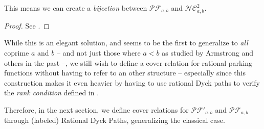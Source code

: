 \begin{prop}
    This means we can create a \emph{bijection} between
    $\mathcal{PF}_{a,b}$ and $\mathcal{NC}^2_{a,b}$.
\end{prop}

\begin{proof}
    See \cite{ref8}.
\end{proof}

While this is an elegant solution, and seems to be the first
to generalize to \emph{all} coprime $a$ and $b$ -- and 
not just those where $a < b$ as studied by Armstrong and others
in the past --, we still wish to define a cover relation for
rational parking functions without having to refer to an other
structure -- especially since this construction makes it even
heavier by having to use rational Dyck paths to verify the
\emph{rank condition} defined in \cite{ref8}.

Therefore, in the next section, we define cover relations
for $\mathcal{PF'}_{a,b}$ and $\mathcal{PF}_{a,b}$ through
(labeled) Rational Dyck Paths, generalizing the classical
case.